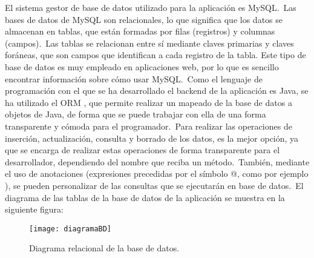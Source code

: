
El sistema gestor de base de datos utilizado para la aplicación es MySQL.\ Las bases de datos de MySQL son
relacionales, lo que significa que los datos se almacenan en tablas, que están formadas por filas (registros) y columnas
(campos).\ Las tablas se relacionan entre sí mediante claves primarias y claves foráneas, que son campos que
identifican a cada registro de la tabla.
Este tipo de base de datos es muy empleado en aplicaciones web, por lo que es sencillo encontrar información sobre
cómo usar MySQL\@.\ Como el lenguaje de programación con el que se ha desarrollado el backend de la aplicación es
Java, se ha utilizado el ORM , que permite realizar un mapeado de la base de datos a objetos de
Java, de forma que se puede trabajar con ella de una forma transparente y cómoda para el programador.\ Para realizar
las operaciones de inserción, actualización, consulta y borrado de los datos,  es la
mejor opción, ya que se encarga de realizar estas operaciones de forma transparente para el desarrollador,
dependiendo del nombre que reciba un método.\ También, mediante el uso de anotaciones (expresiones precedidas por el
símbolo @, como por ejemplo ), se pueden personalizar de las consultas que se ejecutarán en base de
datos.\ El diagrama de las tablas de la base de datos de la aplicación se muestra en la siguiente figura:

\begin{figure}[H]
	\centering
	\texttt{[image: diagramaBD]}
	\caption{Diagrama relacional de la base de datos.}
	\label{fig:diagrama-tablas}
\end{figure}
